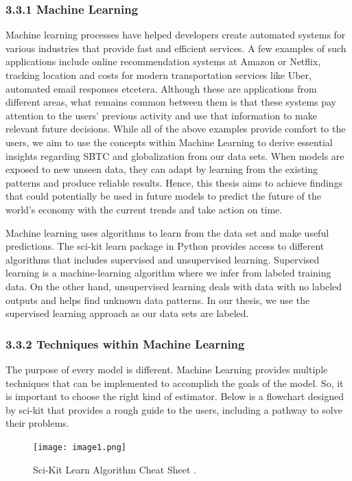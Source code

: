 \documentclass[12pt,oneside]{book} %
\begin{document}
\subsubsection{3.3.1 Machine Learning}

\hspace{20pt}Machine learning processes have helped developers create automated systems for various industries that provide fast and efficient services. A few examples of such applications include online recommendation systems at Amazon or Netflix, tracking location and costs for modern transportation services like Uber, automated email responses etcetera. Although these are applications from different areas, what remains common between them is that these systems pay attention to the users' previous activity and use that information to make relevant future decisions. While all of the above examples provide comfort to the users, we aim to use the concepts within Machine Learning to derive essential insights regarding SBTC and globalization from our data sets. When models are exposed to new unseen data, they can adapt by learning from the existing patterns and produce reliable results. Hence, this thesis aims to achieve findings that could potentially be used in future models to predict the future of the world's economy with the current trends and take action on time.

Machine learning uses algorithms to learn from the data set and make useful predictions. The sci-kit learn package in Python provides access to different algorithms that includes supervised and unsupervised learning. Supervised learning is a machine-learning algorithm where we infer from labeled training data. On the other hand, unsupervised learning deals with data with no labeled outputs and helps find unknown data patterns. In our thesis, we use the supervised learning approach as our data sets are labeled.

\subsubsection{3.3.2 Techniques within Machine Learning}

The purpose of every model is different. Machine Learning provides multiple techniques that can be implemented to accomplish the goals of the model. So, it is important to choose the right kind of estimator. Below is a flowchart designed by sci-kit that provides a rough guide to the users, including a pathway to solve their problems.

\begin{figure}[htpb]
    \centering
\texttt{[image: image1.png]}
\caption{
        Sci-Kit Learn Algorithm Cheat Sheet \cite{scikit-learn}. 
    }
    \label{fig:basics AFM sketch}
\end{figure}
\end{document}
